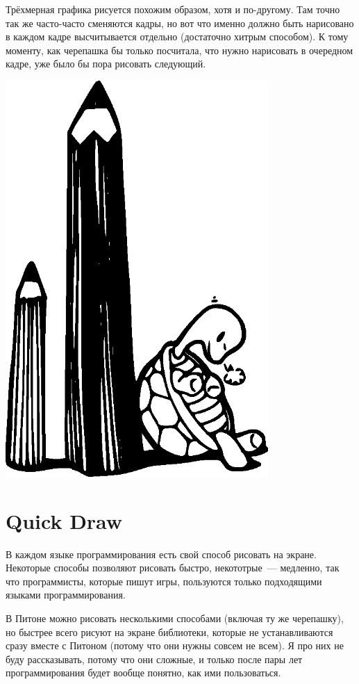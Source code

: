 Трёхмерная графика рисуется похожим образом, хотя и по-другому. Там точно так же часто-часто сменяются кадры, но вот что именно должно быть нарисовано в каждом кадре высчитывается отдельно (достаточно хитрым способом). К тому моменту, как черепашка бы только посчитала, что нужно нарисовать в очередном кадре, уже было бы пора рисовать следующий.

\begin{center}
\includegraphics*[width=100mm]{../en/turtle1.eps}
\end{center}

\section{Quick Draw}

В каждом языке программирования есть свой способ рисовать на экране. Некоторые способы позволяют рисовать быстро, некототрые — медленно, так что программисты, которые пишут игры, пользуются только подходящими языками программирования.

В Питоне можно рисовать несколькими способами (включая ту же черепашку), но быстрее всего рисуют на экране библиотеки, которые не устанавливаются сразу вместе с Питоном (потому что они нужны совсем не всем). Я про них не буду рассказывать, потому что они сложные, и только после пары лет программирования будет вообще понятно, как ими пользоваться.

